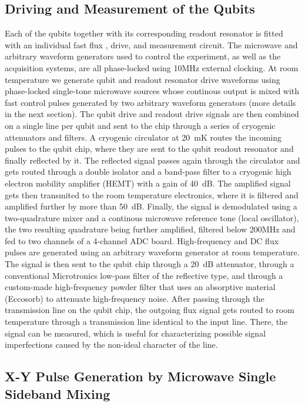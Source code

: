 \subsection{Driving and Measurement of the Qubits}

Each of the qubits together with its corresponding readout resonator is fitted with an individual fast flux , drive, and measurement circuit. The microwave and arbitrary waveform generators used to control the experiment, as well as the acquisition systems, are all phase-locked using 10MHz external clocking.
At room temperature we generate qubit and readout resonator drive waveforms using phase-locked single-tone microwave sources whose continous output is mixed with fast control pulses generated by two arbitrary waveform generators (more details in the next section). The qubit drive and readout drive signals are then combined on a single line per qubit and sent to the chip through a series of cryogenic attenuators and filters. A cryogenic circulator at 20~mK routes the incoming pulses to the qubit chip, where they are sent to the qubit readout resonator and finally reflected by it. The reflected signal passes again through the circulator and gets routed through a double isolator and a band-pass filter to a cryogenic high electron mobility amplifier (HEMT) with a gain of 40~dB. The amplified signal gets then transmited to the room temperature electronics, where it is filtered and amplified further by more than 50~dB. Finally, the signal is demodulated using a two-quadrature mixer and a continous microwave reference tone (local oscillator), the two resulting quadrature being further amplified, filtered below 200MHz and  fed to two channels of  a 4-channel ADC board.
High-frequency and DC flux pulses are generated using an arbitrary waveform generator at room temperature. The signal is then sent to the qubit chip through a 20~dB attenuator, through a conventional Microtronics low-pass filter of the reflective type, and through a custom-made high-frequency powder filter that uses an absorptive material (Eccosorb) to attenuate high-frequency noise. After passing through the transmission line on the qubit chip, the outgoing flux signal gets routed to room temperature through a transmission line identical to the input line. There, the signal can be measured, which is useful for characterizing possible signal imperfections caused by the non-ideal character of the line.

\subsection{X-Y Pulse Generation by Microwave Single Sideband Mixing}

